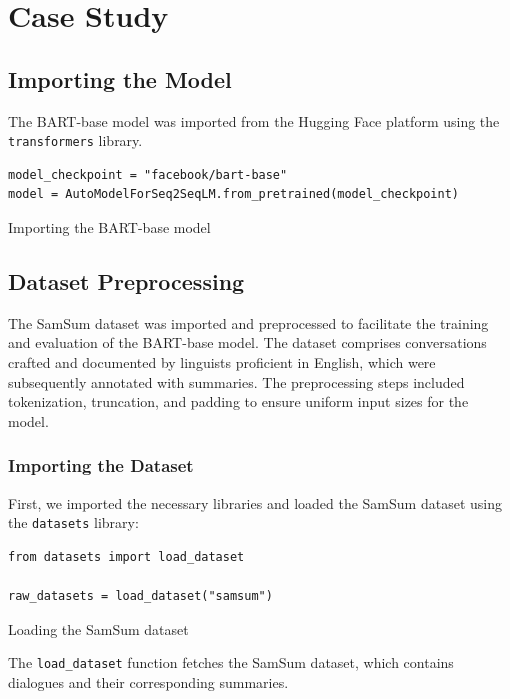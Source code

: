 \section{Case Study}

    \subsection{Importing the Model}
        The BART-base model was imported from the Hugging Face platform using the \texttt{transformers} library.
        \begin{listing}[H]
            \begin{verbatim}
model_checkpoint = "facebook/bart-base"
model = AutoModelForSeq2SeqLM.from_pretrained(model_checkpoint)
            \end{verbatim}
            \caption{Importing the BART-base model}
            \label{listing:Importing_BART}
        \end{listing}
    
        \subsection{Dataset Preprocessing}

The SamSum dataset was imported and preprocessed to facilitate the training and evaluation of the BART-base model. The dataset comprises conversations crafted and documented by linguists proficient in English, which were subsequently annotated with summaries. The preprocessing steps included tokenization, truncation, and padding to ensure uniform input sizes for the model.

\subsubsection{Importing the Dataset}

First, we imported the necessary libraries and loaded the SamSum dataset using the \texttt{datasets} library:

\begin{listing}[H]
\begin{verbatim}
from datasets import load_dataset

raw_datasets = load_dataset("samsum")
\end{verbatim}
\caption{Loading the SamSum dataset}
\label{listing:Loading_SamSum}
\end{listing}

The \texttt{load\_dataset} function fetches the SamSum dataset, which contains dialogues and their corresponding summaries.

